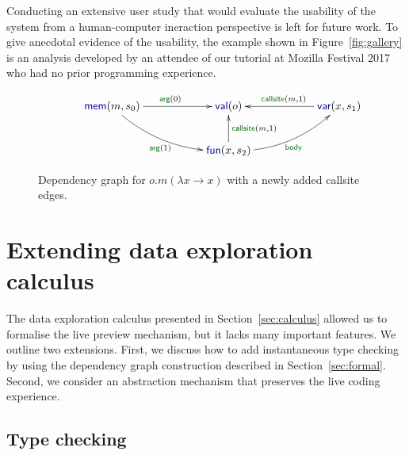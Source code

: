\documentclass[acmsmall,anonymous,fleqn]{acmart}\settopmatter{printfolios=false,printccs=false,printacmref=false}
\theoremstyle{plain}
\theoremstyle{definition}
\newcommand{\bnd}[1]{\textnormal{\textcolor{kvdclr}{\sffamily #1}}}
\newcommand{\blbl}[1]{\textnormal{\textcolor{numclr}{\sffamily #1}}}
\begin{document}
\noindent
Conducting an extensive user study that would evaluate the usability of the system from a
human-computer ineraction perspective is left for future work. To give anecdotal evidence of
the usability, the example shown in Figure~\ref{fig:gallery} is an analysis developed by an
attendee of our tutorial at Mozilla Festival 2017 who had no prior programming experience.


\begin{figure}
\vspace{-0.5em}
\begin{equation*}
\hspace{3em}
\xymatrix{
\bnd{mem}(m, s_0) \ar@/_1pc/[drr]_{\blbl{arg}(1)} \ar[rr]^{\blbl{arg}(0)} && \bnd{val}(o) && \bnd{var}(x, s_1)\ar[ll]_{\blbl{callsite}(m, 1)} \\
&&\bnd{fun}(x, s_2) \ar[u]_{\blbl{callsite}(m, 1)} \ar@/_1pc/[rru]_{\blbl{body}} &&
}
\end{equation*}
\vspace{-0.5em}
\caption{Dependency graph for $o.m(\lambda x\rightarrow x)$ with a newly added \blbl{callsite} edges.}
\label{fig:graph-func}
\vspace{-0.5em}
\end{figure}


\section{Extending data exploration calculus}
\label{sec:extra}

The data exploration calculus presented in Section~\ref{sec:calculus} allowed us to formalise the
live preview mechanism, but it lacks many important features. We outline two extensions.
First, we discuss how to add instantaneous type checking by using the dependency graph construction
described in Section~\ref{sec:formal}. Second, we consider an abstraction mechanism that preserves
the live coding experience.


\subsection{Type checking}
\label{sec:extra-types}
\end{document}
